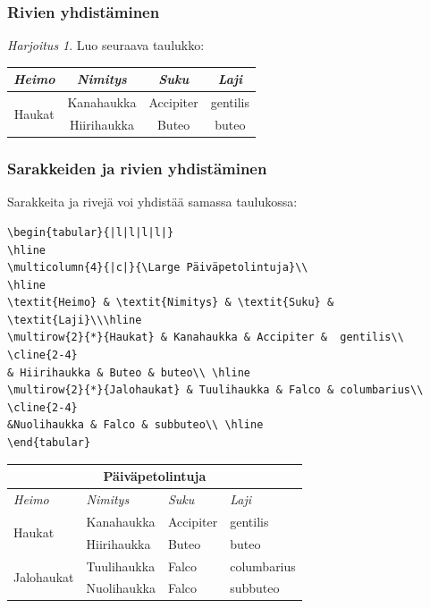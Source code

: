 \documentclass[handout]{beamer}
\theoremstyle{remark}
\newtheorem{harj}{Harjoitus}[section]
\newcommand{\vaihto}{\\ \vspace{10pt}}
\begin{document}
\begin{frame}[fragile]
\frametitle{Rivien yhdistäminen} 
\begin{harj}
Luo seuraava taulukko: 
\begin{table}\label{taulukko}
\begin{tabular}{|c|c|c|c|}
\hline
\textit{Heimo} & \textit{Nimitys} & \textit{Suku} & \textit{Laji}\\ \hline
\multirow{2}{*}{Haukat} & Kanahaukka & Accipiter &  gentilis\\ \cline{2-4}
& Hiirihaukka & Buteo & buteo\\ \hline
\end{tabular}
\end{table}
\end{harj}
\end{frame}
\begin{frame}[fragile]
\frametitle{Sarakkeiden ja rivien yhdistäminen} 
Sarakkeita ja rivejä voi yhdistää samassa taulukossa:\vaihto
\begin{minipage}{8cm}
\begin{scriptsize}
\begin{verbatim}
\begin{tabular}{|l|l|l|l|}
\hline
\multicolumn{4}{|c|}{\Large Päiväpetolintuja}\\
\hline
\textit{Heimo} & \textit{Nimitys} & \textit{Suku} & \textit{Laji}\\\hline
\multirow{2}{*}{Haukat} & Kanahaukka & Accipiter &  gentilis\\ \cline{2-4}
& Hiirihaukka & Buteo & buteo\\ \hline
\multirow{2}{*}{Jalohaukat} & Tuulihaukka & Falco & columbarius\\ \cline{2-4}
&Nuolihaukka & Falco & subbuteo\\ \hline
\end{tabular}
\end{verbatim}
\end{scriptsize}
\end{minipage}
\begin{table}[h!]
\begin{tabular}{|l|l|l|l|}
\hline
\multicolumn{4}{|c|}{\Large Päiväpetolintuja}\\
\hline
\textit{Heimo} & \textit{Nimitys} & \textit{Suku} & \textit{Laji}\\\hline
\multirow{2}{*}{Haukat} & Kanahaukka & Accipiter &  gentilis\\ \cline{2-4}
& Hiirihaukka & Buteo & buteo\\ \hline
\multirow{2}{*}{Jalohaukat} & Tuulihaukka & Falco & columbarius\\ \cline{2-4}
&Nuolihaukka & Falco & subbuteo\\ \hline
\end{tabular}
\end{table}

\end{frame}
\end{document}

